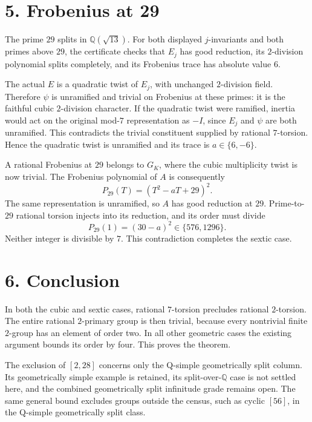 \documentclass[
  11pt,
]{article}
\begin{document}
\section{5. Frobenius at 29}\label{frobenius-at-29}

The prime \(29\) splits in \(\mathbb Q(\sqrt{13})\). For both displayed
\(j\)-invariants and both primes above \(29\), the certificate checks
that \(E_j\) has good reduction, its \(2\)-division polynomial splits
completely, and its Frobenius trace has absolute value \(6\).

The actual \(E\) is a quadratic twist of \(E_j\), with unchanged
\(2\)-division field. Therefore \(\psi\) is unramified and trivial on
Frobenius at these primes: it is the faithful cubic \(2\)-division
character. If the quadratic twist were ramified, inertia would act on
the original mod-\(7\) representation as \(-I\), since \(E_j\) and
\(\psi\) are both unramified. This contradicts the trivial constituent
supplied by rational \(7\)-torsion. Hence the quadratic twist is
unramified and its trace is \(a\in\{6,-6\}\).

A rational Frobenius at \(29\) belongs to \(G_K\), where the cubic
multiplicity twist is now trivial. The Frobenius polynomial of \(A\) is
consequently \[
P_{29}(T)=(T^2-aT+29)^2.
\] The same representation is unramified, so \(A\) has good reduction at
\(29\). Prime-to-\(29\) rational torsion injects into its reduction, and
its order must divide \[
P_{29}(1)=(30-a)^2\in\{576,1296\}.
\] Neither integer is divisible by \(7\). This contradiction completes
the sextic case.

\section{6. Conclusion}\label{conclusion}

In both the cubic and sextic cases, rational \(7\)-torsion precludes
rational \(2\)-torsion. The entire rational \(2\)-primary group is then
trivial, because every nontrivial finite \(2\)-group has an element of
order two. In all other geometric cases the existing argument bounds its
order by four. This proves the theorem.

The exclusion of \([2,28]\) concerns only the Q-simple geometrically
split column. Its geometrically simple example is retained, its
split-over-\(\mathbb Q\) case is not settled here, and the combined
geometrically split infinitude grade remains open. The same general
bound excludes groups outside the census, such as cyclic \([56]\), in
the Q-simple geometrically split class.
\end{document}
